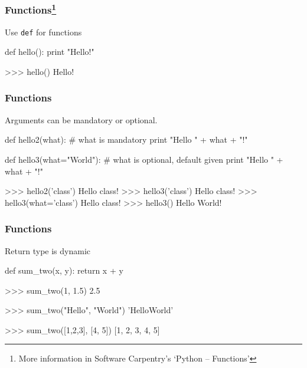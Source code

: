 \documentclass[xetex,10pt]{beamer}
\def\pythoni{\lstinline[language=pythontim]}
\def\spacer{\vspace*{1em}}
\begin{document}
\begin{frame}[fragile]
	\frametitle{Functions\footnote[frame]{More information in Software Carpentry's `Python -- Functions'}}

	Use \pythoni{def} for functions
	\spacer
\pause

\begin{python}
def hello():
    print "Hello!"
\end{python}
\begin{python}
>>> hello()
Hello!
\end{python}

\spacer

\end{frame}

\begin{frame}[fragile]
	\frametitle{Functions}

	Arguments can be mandatory or optional.
	
\begin{python}
def hello2(what):			# what is mandatory
    print "Hello " + what + "!"

def hello3(what="World"):	# what is optional, default given
    print "Hello " + what + "!"
\end{python}

	\spacer
	\pause

\begin{python}
>>> hello2('class')
Hello class!
>>> hello3('class')
Hello class!
>>> hello3(what='class')
Hello class!
>>> hello3()
Hello World!
\end{python}
\end{frame}

\begin{frame}[fragile]
	\frametitle{Functions}
	Return type is dynamic

\begin{python}
def sum_two(x, y):
    return x + y
\end{python}

	\spacer

\begin{python}
>>> sum_two(1, 1.5)
2.5
\end{python}
\pause
\begin{python}
>>> sum_two("Hello", "World")
'HelloWorld'
\end{python}
\pause
\begin{python}
>>> sum_two([1,2,3], [4, 5])
[1, 2, 3, 4, 5]
\end{python}

\end{frame}
\end{document}

